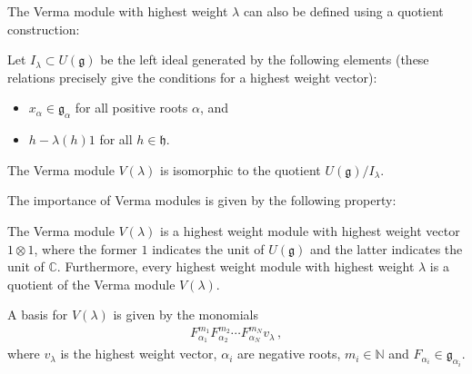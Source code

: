     The Verma module with highest weight $\lambda$ can also be defined using a quotient construction:
    \begin{adefinition}
        Let $I_\lambda\subset U(\mathfrak{g})$ be the left ideal generated by the following elements (these relations precisely give the conditions for a highest weight vector):
        \begin{itemize}
            \item $x_\alpha\in\mathfrak{g_\alpha}$ for all positive roots $\alpha$, and
            \item $h-\lambda(h)1$ for all $h\in\mathfrak{h}$.
        \end{itemize}
        The Verma module $V(\lambda)$ is isomorphic to the quotient $U(\mathfrak{g})/I_\lambda$.
    \end{adefinition}

    The importance of Verma modules is given by the following property:
    \begin{property}
        The Verma module $V(\lambda)$ is a highest weight module with highest weight vector $1\otimes1$, where the former $1$ indicates the unit of $U(\mathfrak{g})$ and the latter indicates the unit of $\mathbb{C}$. Furthermore, every highest weight module with highest weight $\lambda$ is a quotient of the Verma module $V(\lambda)$.
    \end{property}

    \begin{property}
         A basis for $V(\lambda)$ is given by the monomials
         \begin{gather}
             F_{\alpha_1}^{m_1}F_{\alpha_2}^{m_2}\cdots F_{\alpha_N}^{m_N}v_\lambda\,,
         \end{gather}
         where $v_\lambda$ is the highest weight vector, $\alpha_i$ are negative roots, $m_i\in\mathbb{N}$ and $F_{\alpha_i}\in\mathfrak{g}_{\alpha_i}$.
    \end{property}

